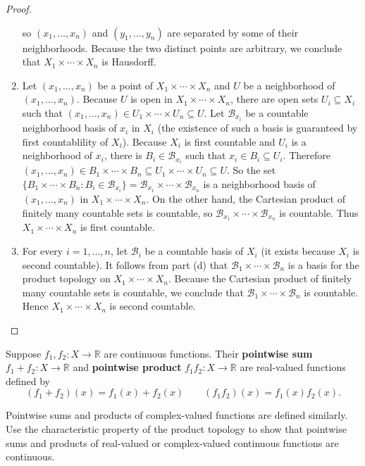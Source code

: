 \begin{proof}
\begin{enumerate}[label={(\alph*)}]
		      so $(x_{1}, \ldots, x_{n})$ and $(y_{1}, \ldots, y_{n})$ are separated by some of their neighborhoods. Because the two distinct points are arbitrary, we conclude that $X_{1}\times\cdots\times X_{n}$ is Hausdorff.
		\item Let $(x_{1}, \ldots, x_{n})$ be a point of $X_{1}\times\cdots\times X_{n}$ and $U$ be a neighborhood of $(x_{1}, \ldots, x_{n})$. Because $U$ is open in $X_{1}\times\cdots\times X_{n}$, there are open sets $U_{i}\subseteq X_{i}$ such that $(x_{1}, \ldots, x_{n})\in U_{1}\times\cdots\times U_{n}\subseteq U$. Let $\mathscr{B}_{x_{i}}$ be a countable neighborhood basis of $x_{i}$ in $X_{i}$ (the existence of such a basis is guaranteed by first countablility of $X_{i}$). Because $X_{i}$ is first countable and $U_{i}$ is a neighborhood of $x_{i}$, there is $B_{i}\in \mathscr{B}_{x_{i}}$ such that $x_{i}\in B_{i}\subseteq U_{i}$. Therefore $(x_{1}, \ldots, x_{n})\in B_{1}\times\cdots\times B_{n}\subseteq U_{1}\times\cdots\times U_{n}\subseteq U$. So the set $\{ B_{1}\times\cdots\times B_{n}: B_{i}\in\mathscr{B}_{x_{i}} \} = \mathscr{B}_{x_{1}}\times\cdots\times\mathscr{B}_{x_{n}}$ is a neighborhood basis of $(x_{1}, \ldots, x_{n})$ in $X_{1}\times\cdots\times X_{n}$. On the other hand, the Cartesian product of finitely many countable sets is countable, so $\mathscr{B}_{x_{1}}\times\cdots\times\mathscr{B}_{x_{n}}$ is countable. Thus $X_{1}\times\cdots\times X_{n}$ is first countable.
		\item For every $i=1,\ldots,n$, let $\mathscr{B}_{i}$ be a countable basis of $X_{i}$ (it exists because $X_{i}$ is second countable). It follows from part (d) that $\mathscr{B}_{1}\times\cdots\times \mathscr{B}_{n}$ is a basis for the product topology on $X_{1}\times\cdots\times X_{n}$. Because the Cartesian product of finitely many countable sets is countable, we conclude that $\mathscr{B}_{1}\times\cdots\times \mathscr{B}_{n}$ is countable. Hence $X_{1}\times\cdots\times X_{n}$ is second countable.
	\end{enumerate}
\end{proof}

\begin{exercise}{3.34}
	Suppose $f_{1}, f_{2}: X\to \mathbb{R}$ are continuous functions. Their \textbf{pointwise sum} $f_{1} + f_{2}: X\to \mathbb{R}$ and \textbf{pointwise product} $f_{1}f_{2}: X\to \mathbb{R}$ are real-valued functions defined by
	\[
		(f_{1} + f_{2})(x) = f_{1}(x) + f_{2}(x)\qquad (f_{1}f_{2})(x) = f_{1}(x)f_{2}(x).
	\]

	Pointwise sums and products of complex-valued functions are defined similarly. Use the characteristic property of the product topology to show that pointwise sums and products of real-valued or complex-valued continuous functions are continuous.
\end{exercise}

